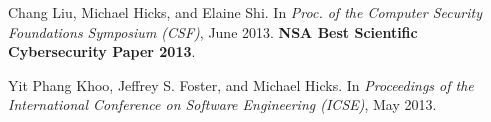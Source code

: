 \documentclass[11pt]{article}
\begin{document}
\begin{description}
\item Chang Liu, Michael Hicks, and Elaine Shi.
   In {\em Proc. of
     the Computer Security Foundations Symposium (CSF)}, June
   2013. \textbf{NSA Best Scientific Cybersecurity Paper 2013}.


\item  
  Yit Phang Khoo, Jeffrey S. Foster, and Michael Hicks.
  In
  \emph{Proceedings of the International Conference on Software Engineering
  (ICSE)}, May 2013.






  

\end{description}
\end{document}
